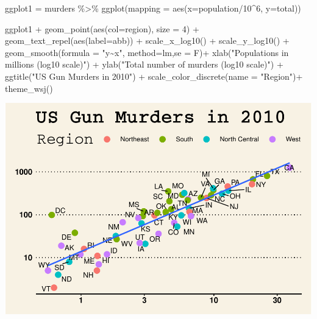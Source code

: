 \documentclass[
]{article}
\newenvironment{Shaded}{\begin{snugshade}}{\end{snugshade}}
\newcommand{\AttributeTok}[1]{\textcolor[rgb]{0.77,0.63,0.00}{#1}}
\newcommand{\DecValTok}[1]{\textcolor[rgb]{0.00,0.00,0.81}{#1}}
\newcommand{\FunctionTok}[1]{\textcolor[rgb]{0.00,0.00,0.00}{#1}}
\newcommand{\NormalTok}[1]{#1}
\newcommand{\OtherTok}[1]{\textcolor[rgb]{0.56,0.35,0.01}{#1}}
\newcommand{\SpecialCharTok}[1]{\textcolor[rgb]{0.00,0.00,0.00}{#1}}
\newcommand{\StringTok}[1]{\textcolor[rgb]{0.31,0.60,0.02}{#1}}
\begin{document}
\begin{Shaded}
\begin{Highlighting}[]
\NormalTok{ggplot1 }\OtherTok{=}\NormalTok{ murders }\SpecialCharTok{\%\textgreater{}\%} \FunctionTok{ggplot}\NormalTok{(}\AttributeTok{mapping =} \FunctionTok{aes}\NormalTok{(}\AttributeTok{x=}\NormalTok{population}\SpecialCharTok{/}\DecValTok{10}\SpecialCharTok{\^{}}\DecValTok{6}\NormalTok{, }\AttributeTok{y=}\NormalTok{total)) }

\NormalTok{  ggplot1 }\SpecialCharTok{+} \FunctionTok{geom\_point}\NormalTok{(}\FunctionTok{aes}\NormalTok{(}\AttributeTok{col=}\NormalTok{region), }\AttributeTok{size =} \DecValTok{4}\NormalTok{) }\SpecialCharTok{+}
  \FunctionTok{geom\_text\_repel}\NormalTok{(}\FunctionTok{aes}\NormalTok{(}\AttributeTok{label=}\NormalTok{abb)) }\SpecialCharTok{+}
  \FunctionTok{scale\_x\_log10}\NormalTok{() }\SpecialCharTok{+}
  \FunctionTok{scale\_y\_log10}\NormalTok{() }\SpecialCharTok{+}
  \FunctionTok{geom\_smooth}\NormalTok{(}\AttributeTok{formula =} \StringTok{"y\textasciitilde{}x"}\NormalTok{, }\AttributeTok{method=}\NormalTok{lm,}\AttributeTok{se =}\NormalTok{ F)}\SpecialCharTok{+}
  \FunctionTok{xlab}\NormalTok{(}\StringTok{"Populations in millions (log10 scale)"}\NormalTok{) }\SpecialCharTok{+} 
  \FunctionTok{ylab}\NormalTok{(}\StringTok{"Total number of murders (log10 scale)"}\NormalTok{) }\SpecialCharTok{+}
  \FunctionTok{ggtitle}\NormalTok{(}\StringTok{"US Gun Murders in 2010"}\NormalTok{) }\SpecialCharTok{+}
  \FunctionTok{scale\_color\_discrete}\NormalTok{(}\AttributeTok{name =} \StringTok{"Region"}\NormalTok{)}\SpecialCharTok{+}
      \FunctionTok{theme\_wsj}\NormalTok{()}
\end{Highlighting}
\end{Shaded}

\includegraphics{index_files/figure-latex/unnamed-chunk-2-1.pdf}
\end{document}
